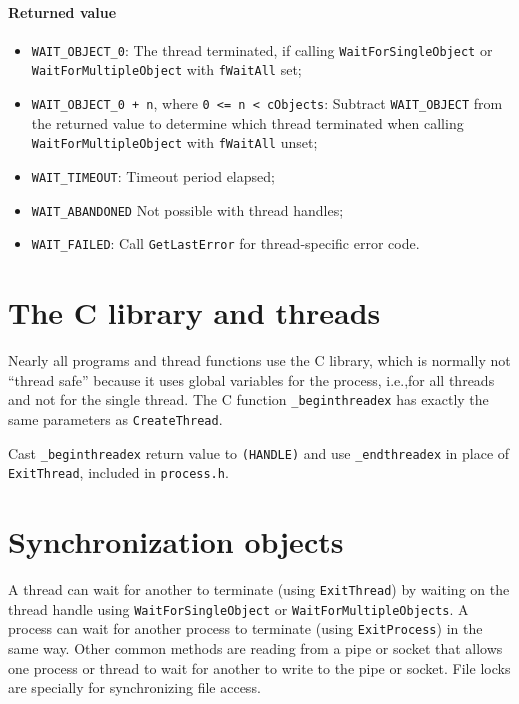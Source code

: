 \paragraph{Returned value}
\begin{itemize}
\item \texttt{WAIT\_OBJECT\_0}: The thread terminated, if calling \texttt{WaitForSingleObject} or \texttt{WaitForMultipleObject} with \texttt{fWaitAll} set;
\item \texttt{WAIT\_OBJECT\_0 + n}, where \texttt{0 <= n < cObjects}: Subtract \texttt{WAIT\_OBJECT} from the returned value to determine which thread terminated when calling \texttt{WaitForMultipleObject} with \texttt{fWaitAll} unset;
\item \texttt{WAIT\_TIMEOUT}: Timeout period elapsed;
\item \texttt{WAIT\_ABANDONED} Not possible with thread handles;
\item \texttt{WAIT\_FAILED}: Call \texttt{GetLastError} for thread-specific error code.
\end{itemize}

\section{The C library and threads}
Nearly all programs and thread functions use the C library, which is normally not ``thread safe'' because it uses global variables for the process, i.e.,\@ for all threads and not for the single thread. The C function \texttt{\_beginthreadex} has exactly the same parameters as \texttt{CreateThread}.

Cast \texttt{\_beginthreadex} return value to \texttt{(HANDLE)} and use \texttt{\_endthreadex} in place of \texttt{ExitThread}, included in \texttt{process.h}.

\section{Synchronization objects}
A thread can wait for another to terminate (using \texttt{ExitThread}) by waiting on the thread handle using \texttt{WaitForSingleObject} or \texttt{WaitForMultipleObjects}. A process can wait for another process to terminate (using \texttt{ExitProcess}) in the same way. Other common methods are reading from a pipe or socket that allows one process or thread to wait for another to write to the pipe or socket. File locks are specially for synchronizing file access.

